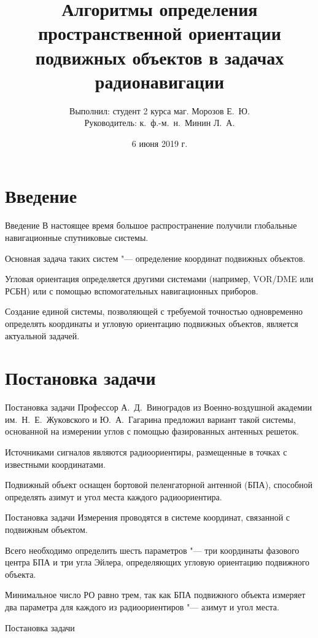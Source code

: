 \documentclass[russian,hyperref={unicode}]{beamer}
\title{Алгоритмы определения пространственной ориентации подвижных объектов в задачах радионавигации}
\institute
{
  Воронежский Государственный Университет \\
  Факультет Компьютерных Наук \\
  Кафедра Цифровых Технологий
}
\author
{
  Выполнил: студент 2 курса маг. Морозов Е.~Ю. \\
  Руководитель: к.~ф.-м.~н.~Минин Л.~А.
}
\date{6 июня 2019 г.}
\begin{document}
  \frame{\titlepage}

  \section{Введение}
  \begin{frame}{Введение}
    В настоящее время большое распространение получили глобальные навигационные спутниковые системы.

    Основная задача таких систем "--- определение координат подвижных объектов.

    Угловая ориентация определяется другими системами (например, VOR/DME или РСБН) или с помощью вспомогательных навигационных приборов.

    Создание единой системы, позволяющей с требуемой точностью одновременно определять координаты и угловую ориентацию подвижных объектов, является актуальной задачей.~\nocite{WMMU:2019:IIS, WMMU:2019:RLNC, WMM:2018}
  \end{frame}

  \section{Постановка задачи}
  \begin{frame}{Постановка задачи}
    Профессор А.~Д.~Виноградов из Военно-воздушной академии им.~Н.~Е.~Жуковского и Ю.~А.~Гагарина предложил вариант такой системы, основанной на измерении углов с помощью фазированных антенных решеток.

    Источниками сигналов являются радиоориентиры, размещенные в точках с известными координатами.

    Подвижный объект оснащен бортовой пеленгаторной антенной (БПА), способной определять азимут и угол места каждого радиоориентира.
  \end{frame}

  \begin{frame}{Постановка задачи}
    Измерения проводятся в системе координат, связанной с подвижным объектом.

    Всего необходимо определить шесть параметров "--- три координаты фазового центра БПА и три угла Эйлера, определяющих угловую ориентацию подвижного объекта.

    Минимальное число РО равно трем, так как БПА подвижного объекта измеряет два параметра для каждого из радиоориентиров "--- азимут и угол места.
  \end{frame}

  \begin{frame}{Постановка задачи}
    \begin{columns}[c]
      \begin{column}{.5\textwidth}
      \end{column}
      \begin{column}{.5\textwidth}
        \begin{center}
        \end{center}
      \end{column}
    \end{columns}
  \end{frame}
\end{document}
